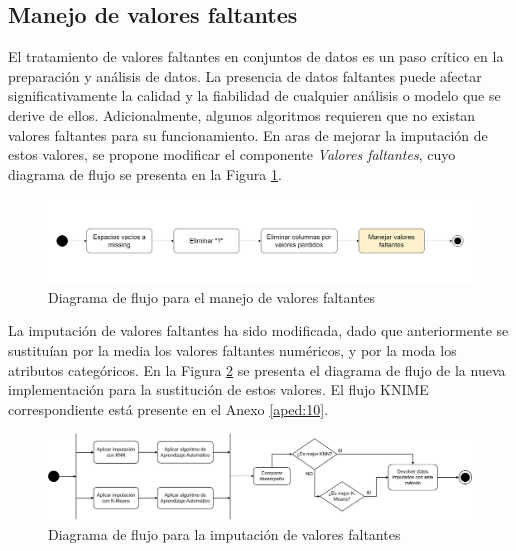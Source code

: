 \subsection{Manejo de valores faltantes}
El tratamiento de valores faltantes en conjuntos de datos es un paso crítico en la preparación y análisis de datos. La presencia de datos faltantes puede afectar significativamente la calidad y la fiabilidad de cualquier análisis o modelo que se derive de ellos. Adicionalmente, algunos algoritmos requieren que no existan valores faltantes para su funcionamiento. En aras de mejorar la imputación de estos valores, se propone modificar el componente \textit{Valores faltantes}, cuyo diagrama de flujo se presenta en la Figura \ref{fig:valores-faltantes}.

\begin{figure}[H]
	\centering
	\includegraphics[width=1\linewidth]{"figuras/capi 2/preprocesado/valores faltantes.drawio"}
	\caption{Diagrama de flujo para el manejo de valores faltantes}
	\label{fig:valores-faltantes}
\end{figure}

La imputación de valores faltantes ha sido modificada, dado que anteriormente se sustituían por la media los valores faltantes numéricos, y por la moda los atributos categóricos. En la Figura \ref{fig:mv-imputation} se presenta el diagrama de flujo de la nueva implementación para la sustitución de estos valores. El flujo KNIME correspondiente está presente en el Anexo \ref{aped:10}. 

\begin{figure}[H]
	\centering
	\includegraphics[width=1\linewidth]{"figuras/capi 2/preprocesado/mv imputation.drawio"}
	\caption{Diagrama de flujo para la imputación de valores faltantes}
	\label{fig:mv-imputation}
\end{figure}

